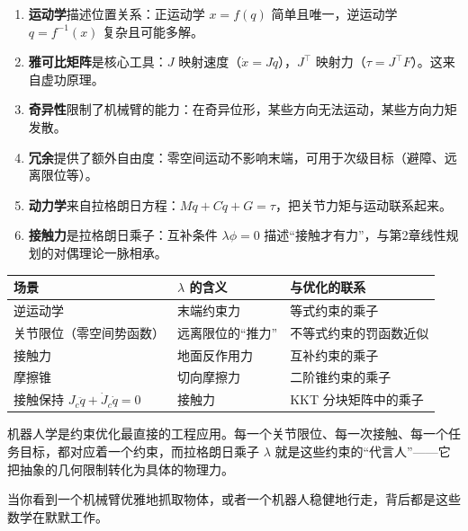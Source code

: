 \begin{enumerate}
    \item \textbf{运动学}描述位置关系：正运动学 $x = f(q)$ 简单且唯一，逆运动学 $q = f^{-1}(x)$ 复杂且可能多解。
    
    \item \textbf{雅可比矩阵}是核心工具：$J$ 映射速度（$\dot{x} = J\dot{q}$），$J^\top$ 映射力（$\tau = J^\top F$）。这来自虚功原理。
    
    \item \textbf{奇异性}限制了机械臂的能力：在奇异位形，某些方向无法运动，某些方向力矩发散。
    
    \item \textbf{冗余}提供了额外自由度：零空间运动不影响末端，可用于次级目标（避障、远离限位等）。
    
    \item \textbf{动力学}来自拉格朗日方程：$M\ddot{q} + C\dot{q} + G = \tau$，把关节力矩与运动联系起来。
    
    \item \textbf{接触力}是拉格朗日乘子：互补条件 $\lambda \phi = 0$ 描述“接触才有力”，与第2章线性规划的对偶理论一脉相承。
\end{enumerate}

\begin{unification}[title=$\lambda$ 在机器人学中的多重身份]
\begin{center}
\renewcommand{\arraystretch}{1.4}
\small
\begin{tabularx}{\linewidth}{X|l|X}
\toprule
\textbf{场景} & \textbf{$\lambda$ 的含义} & \textbf{与优化的联系} \\
\midrule
逆运动学 & 末端约束力 & 等式约束的乘子 \\
关节限位（零空间势函数） & 远离限位的“推力” & 不等式约束的罚函数近似 \\
接触力 & 地面反作用力 & 互补约束的乘子 \\
摩擦锥 & 切向摩擦力 & 二阶锥约束的乘子 \\
接触保持 $J_c\ddot{q} + \dot{J}_c\dot{q} = 0$ & 接触力 & KKT 分块矩阵中的乘子 \\
\bottomrule
\end{tabularx}
\end{center}
\end{unification}

\begin{insightbox}
机器人学是约束优化最直接的工程应用。每一个关节限位、每一次接触、每一个任务目标，都对应着一个约束，而拉格朗日乘子 $\lambda$ 就是这些约束的“代言人”——它把抽象的几何限制转化为具体的物理力。

当你看到一个机械臂优雅地抓取物体，或者一个机器人稳健地行走，背后都是这些数学在默默工作。
\end{insightbox}

